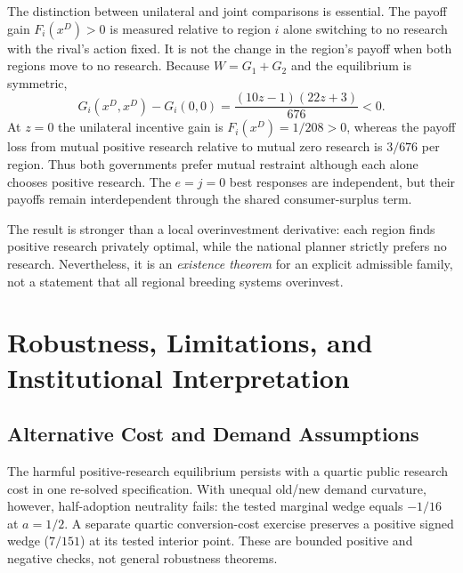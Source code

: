 \documentclass[USenglish]{article}
\begin{document}
The distinction between unilateral and joint comparisons is essential. The payoff gain $F_i(x^D)>0$ is measured relative to region $i$ alone switching to no research with the rival's action fixed. It is not the change in the region's payoff when both regions move to no research. Because $W=G_1+G_2$ and the equilibrium is symmetric,
\begin{equation}
G_i(x^D,x^D)-G_i(0,0)=\frac{(10z-1)(22z+3)}{676}<0.
\label{eq:mutuallocal}
\end{equation}
At $z=0$ the unilateral incentive gain is $F_i(x^D)=1/208>0$, whereas the payoff loss from mutual positive research relative to mutual zero research is $3/676$ per region. Thus both governments prefer mutual restraint although each alone chooses positive research. The $e=j=0$ best responses are independent, but their payoffs remain interdependent through the shared consumer-surplus term.

The result is stronger than a local overinvestment derivative: each region finds positive research privately optimal, while the national planner strictly prefers no research. Nevertheless, it is an \emph{existence theorem} for an explicit admissible family, not a statement that all regional breeding systems overinvest.

\section{Robustness, Limitations, and Institutional Interpretation}
\subsection{Alternative Cost and Demand Assumptions}
The harmful positive-research equilibrium persists with a quartic public research cost in one re-solved specification. With unequal old/new demand curvature, however, half-adoption neutrality fails: the tested marginal wedge equals $-1/16$ at $a=1/2$. A separate quartic conversion-cost exercise preserves a positive signed wedge ($7/151$) at its tested interior point. These are bounded positive and negative checks, not general robustness theorems.
\end{document}
